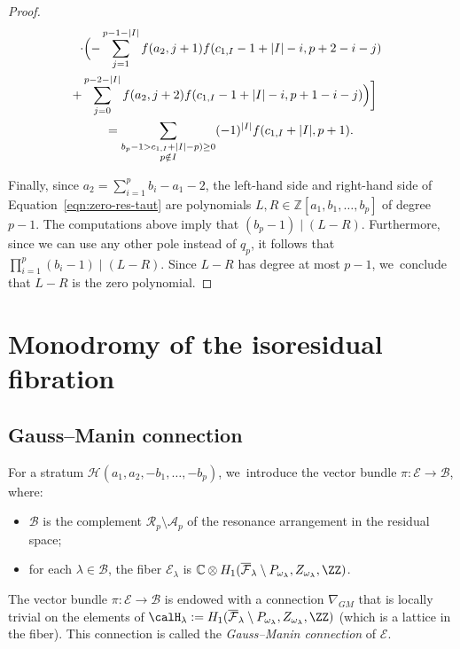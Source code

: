 \begin{proof}
\begin{minipage}{\textwidth}
\begin{multline*}
\cdot\Bigl(-\sum_{j=1}^{p-1-|I|}f(a_2,j+1)f(c_{1,I}-1+|I|-i,p+2-i-j)\\
\shoveright{+\sum_{j=0}^{p-2-|I|}f(a_2,j+2)f(c_{1,I}-1+|I|-i,p+1-i-j)\Bigr)\biggr]}\\
=\sum_{\substack{b_p-1>c_{1,I}+|I|-p)\geq 0\\ p\notin I}}(-1)^{|I|}f(c_{1,I}+|I|,p+1).
\end{multline*}
\end{minipage}
\par\smallskip\noindent
Finally, since $a_2=\sum_{i=1}^p b_i -a_1-2$, the left-hand side and right-hand side of Equation~\eqref{eqn:zero-res-taut} are polynomials $L,R\in \mathbb{Z}[a_1,b_1,\ldots,b_p]$ of degree $p-1$. The computations above imply that $(b_p-1) \mid (L-R)$. Furthermore, since we can use any other pole instead of $q_p$, it follows that $\prod_{i=1}^p(b_i-1)\mid (L-R)$. Since $L-R$ has degree at most $p-1$, we~conclude that $L-R$ is the zero polynomial.
\end{proof}

\section{Monodromy of the isoresidual fibration}\label{sec:GaussManin}

\subsection{Gauss--Manin connection}

For a stratum $\mathcal{H}(a_{1},a_{2},-b_{1},\dots,-b_{p})$, we~introduce the vector bundle $\pi\colon\mathcal{E} \to \mathcal{B}$, where:
\begin{itemize}
\item $\mathcal{B}$ is the complement $\mathcal{R}_{p} \setminus \mathcal{A}_{p}$ of the resonance arrangement in the residual space;
\item for each $\lambda \in \mathcal{B}$, the fiber $\mathcal{E}_{\lambda}$ is $\mathbb{C} \otimes H_{1}(\overline{\mathcal{F}}_{\lambda} \setminus P_{\omega_{\lambda}}, Z_{\omega_{\lambda}},\ZZ)$.
\end{itemize}
The vector bundle $\pi\colon\mathcal{E} \to \mathcal{B}$ is endowed with a connection $\nabla_{GM}$ that is locally trivial on the elements of $\calH_{\lambda}:= H_{1}(\overline{\mathcal{F}}_{\lambda} \setminus P_{\omega_{\lambda}}, Z_{\omega_{\lambda}},\ZZ)$ (which is a lattice in the fiber). This connection is called the \textit{Gauss--Manin connection} of $\mathcal{E} $.

